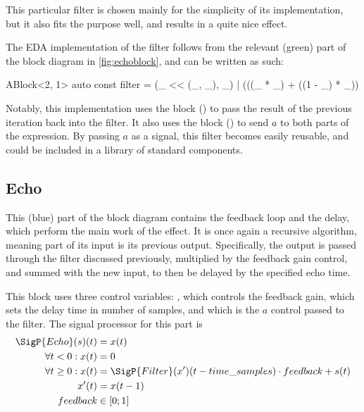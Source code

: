 This particular filter is chosen mainly for the simplicity of its implementation, but it also fits the
purpose well, and results in a quite nice effect.

The EDA implementation of the filter follows from the relevant (green) part of the block diagram in
\autoref{fig:echoblock}, and can be written as such:

\begin{cppcodenl}
  ABlock<2, 1> auto const filter = (_ << (_, _), _) | (((_ * _) + ((1 - _) * _)) %
\end{cppcodenl}

Notably, this implementation uses the \Recursive block () to pass the result of the
previous iteration back into the filter. It also uses the \Split block (\cpp{<<}) to send
$a$ to both parts of the expression. By passing $a$ as a signal, this
filter becomes easily reusable, and could be included in a library of standard components.

\subsection{Echo}

This (blue) part of the block diagram contains the feedback loop and the delay, which perform the main work
of the effect. It is once again a recursive algorithm, meaning part of its input is its previous output.
Specifically, the output is passed through the filter discussed previously, multiplied by the feedback gain
control, and summed with the new input, to then be delayed by the specified echo time.

This block uses three control variables: , which controls the feedback gain,  which sets the delay time in
number of samples, and  which is the $a$ control passed to the
filter. The signal processor for this part is %
\begin{align*}
  \SigP{Echo}(s)(t)       & = x(t)                                                     \\
  \forall t < 0 : x(t)    & = 0                                                        \\
  \forall t \geq 0 : x(t) & = \SigP{Filter}(x')(t-time\_samples) \cdot feedback + s(t) \\
  x'(t)                   & =x(t-1)                                                    \\
  feedback                & \in [0; 1]
\end{align*}

